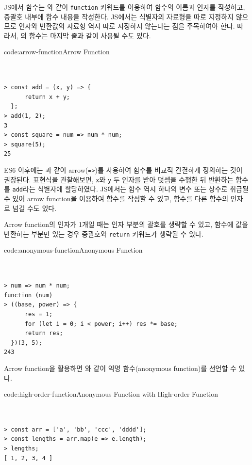 JS에서 함수는 와 같이 \texttt{function} 키워드를 이용하여 함수의 이름과 인자를 작성하고, 중괄호 내부에 함수 내용을 작성한다. JS에서는 식별자의 자료형을 따로 지정하지 않으므로 인자와 반환값의 자료형 역시 따로 지정하지 않는다는 점을 주목하여야 한다. 따라서, 의 함수는 마지막 줄과 같이 사용될 수도 있다.

\begin{codeenv}{code:arrow-function}{Arrow Function}\begin{verbatim}


> const add = (x, y) => {
      return x + y;
  };
> add(1, 2);
3
> const square = num => num * num;
> square(5);
25
\end{verbatim}
\end{codeenv}

ES6 이후에는 과 같이 arrow(\texttt{=>})를 사용하여 함수를 비교적 간결하게 정의하는 것이 권장된다. 표현식을 관찰해보면, \texttt{x}와 \texttt{y} 두 인자를 받아 덧셈을 수행한 뒤 반환하는 함수를 \texttt{add}라는 식별자에 할당하였다. JS에서는 함수 역시 하나의 변수 또는 상수로 취급될 수 있어 arrow function을 이용하여 함수를 작성할 수 있고, 함수를 다른 함수의 인자로 넘길 수도 있다.

Arrow function의 인자가 1개일 때는 인자 부분의 괄호를 생략할 수 있고, 함수에 값을 반환하는 부분만 있는 경우 중괄호와 \texttt{return} 키워드가 생략될 수 있다.

\begin{codeenv}{code:anonymous-function}{Anonymous Function}\begin{verbatim}


> num => num * num;
function (num)
> ((base, power) => {
      res = 1;
      for (let i = 0; i < power; i++) res *= base;
      return res;
  })(3, 5);
243
\end{verbatim}
\end{codeenv}

Arrow function을 활용하면 와 같이 익명 함수(anonymous function)를 선언할 수 있다.

\begin{codeenv}{code:high-order-function}{Anonymous Function with High-order Function}\begin{verbatim}


> const arr = ['a', 'bb', 'ccc', 'dddd'];
> const lengths = arr.map(e => e.length);
> lengths;
[ 1, 2, 3, 4 ]
\end{verbatim}
\end{codeenv}

